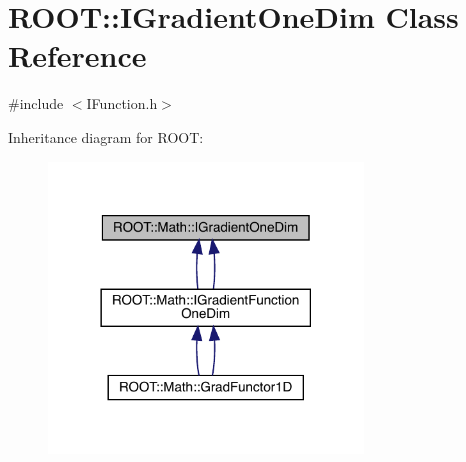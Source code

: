 \hypertarget{classROOT_1_1Math_1_1IGradientOneDim}{}\section{R\+O\+OT\+:\+:I\+Gradient\+One\+Dim Class Reference}
\label{classROOT_1_1Math_1_1IGradientOneDim}


{\ttfamily \#include $<$I\+Function.\+h$>$}



Inheritance diagram for R\+O\+OT\+:\nopagebreak
\begin{figure}[H]
\begin{center}
\leavevmode
\includegraphics[width=237pt]{d9/de4/classROOT_1_1Math_1_1IGradientOneDim__inherit__graph}
\end{center}
\end{figure}
